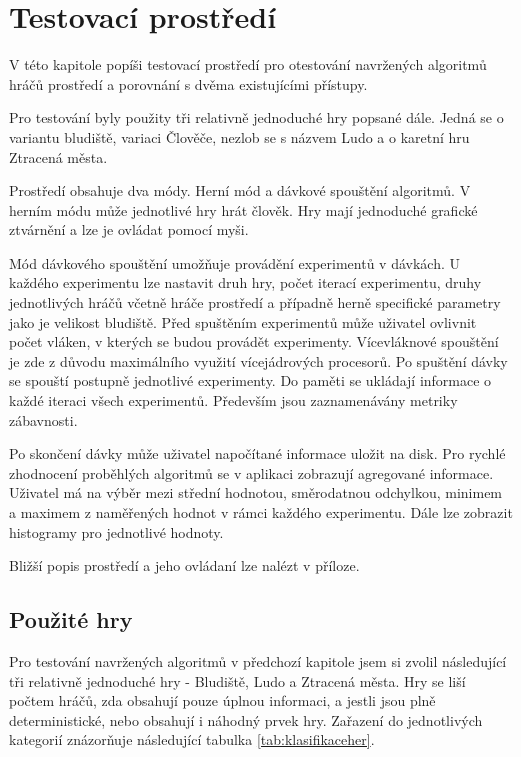 \chapter{Testovací prostředí}

V této kapitole popíši testovací prostředí pro otestování navržených algoritmů hráčů prostředí a porovnání s dvěma existujícími přístupy.

Pro testování byly použity tři relativně jednoduché hry popsané dále. Jedná se o variantu bludiště, variaci Člověče, nezlob se s názvem Ludo a o karetní hru Ztracená města.

Prostředí obsahuje dva módy. Herní mód a dávkové spouštění algoritmů. V herním módu může jednotlivé hry hrát člověk. Hry mají jednoduché grafické ztvárnění a lze je ovládat pomocí myši.

Mód dávkového spouštění umožňuje provádění experimentů v dávkách. U každého experimentu lze nastavit druh hry, počet iterací experimentu, druhy jednotlivých hráčů včetně hráče prostředí a případně herně specifické parametry jako je velikost bludiště. Před spuštěním experimentů může uživatel ovlivnit počet vláken, v kterých se budou provádět experimenty. Vícevláknové spouštění je zde z důvodu maximálního využití vícejádrových procesorů. Po spuštění dávky se spouští postupně jednotlivé experimenty. Do paměti se ukládají informace o každé iteraci všech experimentů. Především jsou zaznamenávány metriky zábavnosti. 

Po skončení dávky může uživatel napočítané informace uložit na disk. Pro rychlé zhodnocení proběhlých algoritmů se v aplikaci zobrazují agregované informace. Uživatel má na výběr mezi střední hodnotou, směrodatnou odchylkou, minimem a maximem z naměřených hodnot v rámci každého experimentu. Dále lze zobrazit histogramy pro jednotlivé hodnoty.

Bližší popis prostředí a jeho ovládaní lze nalézt v příloze.

\section{Použité hry}

Pro testování navržených algoritmů v předchozí kapitole jsem si zvolil následující tři relativně jednoduché hry - Bludiště, Ludo a Ztracená města. Hry se liší počtem hráčů, zda obsahují pouze úplnou informaci, a jestli jsou plně deterministické, nebo obsahují i náhodný prvek hry. Zařazení do jednotlivých kategorií znázorňuje následující tabulka \ref{tab:klasifikaceher}.

